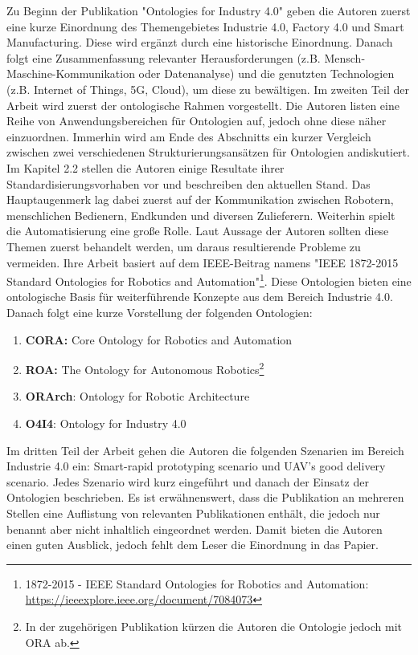 \documentclass{article}
\begin{document}
Zu Beginn der Publikation "Ontologies for Industry 4.0" \cite{kumar2019ontologies} geben die Autoren zuerst eine kurze Einordnung des Themengebietes Industrie 4.0, Factory 4.0 und Smart Manufacturing.
Diese wird ergänzt durch eine historische Einordnung.
Danach folgt eine Zusammenfassung relevanter Herausforderungen (z.B. Mensch-Maschine-Kommunikation oder Datenanalyse) und die genutzten Technologien (z.B. Internet of Things, 5G, Cloud), um diese zu bewältigen.
Im zweiten Teil der Arbeit wird zuerst der ontologische Rahmen vorgestellt.
Die Autoren listen eine Reihe von Anwendungsbereichen für Ontologien auf, jedoch ohne diese näher einzuordnen.
Immerhin wird am Ende des Abschnitts ein kurzer Vergleich zwischen zwei verschiedenen Strukturierungsansätzen für Ontologien andiskutiert.
Im Kapitel 2.2 stellen die Autoren einige Resultate ihrer Standardisierungsvorhaben vor und beschreiben den aktuellen Stand.
Das Hauptaugenmerk lag dabei zuerst auf der Kommunikation zwischen Robotern, menschlichen Bedienern, Endkunden und diversen Zulieferern.
Weiterhin spielt die Automatisierung eine große Rolle.
Laut Aussage der Autoren sollten diese Themen zuerst behandelt werden, um daraus resultierende Probleme zu vermeiden.
Ihre Arbeit basiert auf dem IEEE-Beitrag namens "IEEE 1872-2015 Standard Ontologies for Robotics and Automation"\footnote{1872-2015 - IEEE Standard Ontologies for Robotics and Automation: \url{https://ieeexplore.ieee.org/document/7084073}}.
Diese Ontologien bieten eine ontologische Basis für weiterführende Konzepte aus dem Bereich Industrie 4.0.
Danach folgt eine kurze Vorstellung der folgenden Ontologien:
\begin{enumerate}
    \item \textbf{CORA:} Core Ontology for Robotics and Automation
    \item \textbf{ROA:} The Ontology for Autonomous Robotics\footnote{In der zugehörigen Publikation\cite{olszewska2017ontology} kürzen die Autoren die Ontologie jedoch mit ORA ab.}
    \item \textbf{ORArch}: Ontology for Robotic Architecture
    \item \textbf{O4I4}: Ontology for Industry 4.0
\end{enumerate}

Im dritten Teil der Arbeit gehen die Autoren die folgenden Szenarien im Bereich Industrie 4.0 ein: Smart-rapid prototyping scenario und UAV’s good delivery scenario.
Jedes Szenario wird kurz eingeführt und danach der Einsatz der Ontologien beschrieben.
Es ist erwähnenswert, dass die Publikation an mehreren Stellen eine Auflistung von relevanten Publikationen enthält, die jedoch nur benannt aber nicht inhaltlich eingeordnet werden. Damit bieten die Autoren einen guten Ausblick, jedoch fehlt dem Leser die Einordnung in das Papier.
\end{document}
